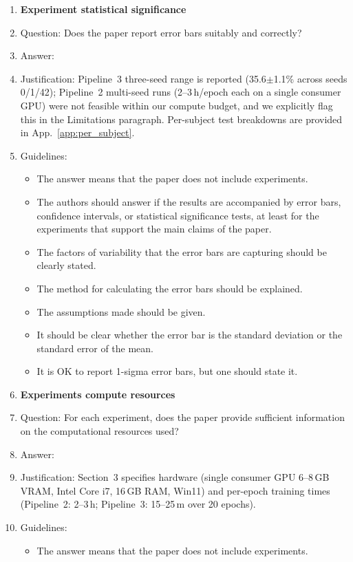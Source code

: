 \documentclass{article}
\begin{document}
\begin{enumerate}
\item {\bf Experiment statistical significance}
    \item[] Question: Does the paper report error bars suitably and correctly?
    \item[] Answer: \answerNo{}
    \item[] Justification: Pipeline~3 three-seed range is reported (35.6$\pm$1.1\% across seeds 0/1/42); Pipeline~2 multi-seed runs (2--3\,h/epoch each on a single consumer GPU) were not feasible within our compute budget, and we explicitly flag this in the Limitations paragraph. Per-subject test breakdowns are provided in App.~\ref{app:per_subject}.
    \item[] Guidelines:
    \begin{itemize}
        \item The answer \answerNA{} means that the paper does not include experiments.
        \item The authors should answer \answerYes{} if the results are accompanied by error bars, confidence intervals, or statistical significance tests, at least for the experiments that support the main claims of the paper.
        \item The factors of variability that the error bars are capturing should be clearly stated.
        \item The method for calculating the error bars should be explained.
        \item The assumptions made should be given.
        \item It should be clear whether the error bar is the standard deviation or the standard error of the mean.
        \item It is OK to report 1-sigma error bars, but one should state it.
    \end{itemize}

\item {\bf Experiments compute resources}
    \item[] Question: For each experiment, does the paper provide sufficient information on the computational resources used?
    \item[] Answer: \answerYes{}
    \item[] Justification: Section~3 specifies hardware (single consumer GPU 6--8\,GB VRAM, Intel Core i7, 16\,GB RAM, Win11) and per-epoch training times (Pipeline~2: 2--3\,h; Pipeline~3: 15--25\,m over 20 epochs).
    \item[] Guidelines:
    \begin{itemize}
        \item The answer \answerNA{} means that the paper does not include experiments.
    \end{itemize}


\end{enumerate}
\end{document}
